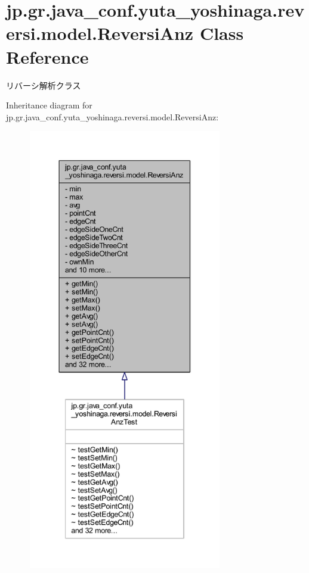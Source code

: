 \hypertarget{classjp_1_1gr_1_1java__conf_1_1yuta__yoshinaga_1_1reversi_1_1model_1_1_reversi_anz}{}\section{jp.\+gr.\+java\+\_\+conf.\+yuta\+\_\+yoshinaga.\+reversi.\+model.\+Reversi\+Anz Class Reference}
\label{classjp_1_1gr_1_1java__conf_1_1yuta__yoshinaga_1_1reversi_1_1model_1_1_reversi_anz}


リバーシ解析クラス  




Inheritance diagram for jp.\+gr.\+java\+\_\+conf.\+yuta\+\_\+yoshinaga.\+reversi.\+model.\+Reversi\+Anz\+:\nopagebreak
\begin{figure}[H]
\begin{center}
\leavevmode
\includegraphics[height=550pt]{classjp_1_1gr_1_1java__conf_1_1yuta__yoshinaga_1_1reversi_1_1model_1_1_reversi_anz__inherit__graph}
\end{center}
\end{figure}


